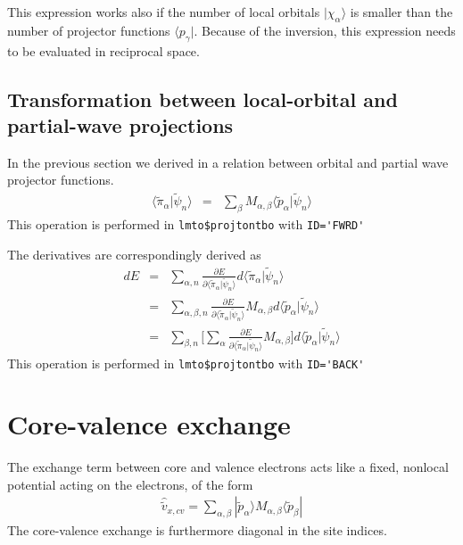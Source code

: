 \documentclass[11pt,a4paper]{report}
\begin{document}
This expression works also if the number of local orbitals
$|\chi_\alpha\rangle$ is smaller than the number of projector
functions $\langle{p}_\gamma|$. Because of the inversion, this
expression needs to be evaluated in reciprocal space.

\subsection{Transformation between local-orbital and partial-wave projections}
In the previous section we derived in  a relation
between orbital and partial wave projector functions.
\begin{eqnarray}
\langle\tilde{\pi}_\alpha|\tilde{\psi}_n\rangle
&=&\sum_\beta M_{\alpha,\beta}\langle\tilde{p}_\alpha|\tilde{\psi}_n\rangle
\end{eqnarray}
This operation is performed in \verb|lmto$projtontbo| with \verb|ID='FWRD'|


The derivatives are correspondingly derived as 
\begin{eqnarray}
dE
&=&
\sum_{\alpha,n}\frac{\partial E}{\partial \langle\tilde{\pi}_\alpha|\tilde{\psi}_n\rangle}
d\langle\tilde{\pi}_\alpha|\tilde{\psi}_n\rangle
\nonumber\\
&=&
\sum_{\alpha,\beta,n}\frac{\partial E}
{\partial \langle\tilde{\pi}_\alpha|\tilde{\psi}_n\rangle}
M_{\alpha,\beta}d\langle\tilde{p}_\alpha|\tilde{\psi}_n\rangle
\nonumber\\
&=&
\sum_{\beta,n}
\biggl[\sum_{\alpha}
\frac{\partial E}
{\partial \langle\tilde{\pi}_\alpha|\tilde{\psi}_n\rangle}
M_{\alpha,\beta}\biggr]d\langle\tilde{p}_\alpha|\tilde{\psi}_n\rangle
\end{eqnarray}
This operation is performed in \verb|lmto$projtontbo| with \verb|ID='BACK'|



\section{Core-valence exchange}
The exchange term between core and valence electrons acts like a
fixed, nonlocal potential acting on the electrons, of the form
\begin{eqnarray}
\hat{\tilde{v}}_{x,cv}=\sum_{\alpha,\beta}|\tilde{p}_\alpha\rangle 
M_{\alpha,\beta}\langle\tilde{p}_\beta|
\end{eqnarray}
The core-valence exchange is furthermore diagonal in the site indices.
\end{document}
